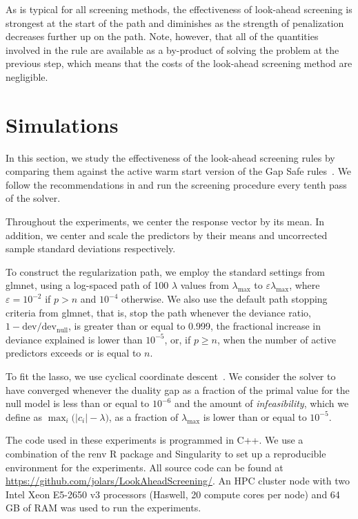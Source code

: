 \documentclass[b5paper,10pt,abstractoff,DIV=calc,headings=normal,twoside]{scrartcl}
\theoremstyle{plain}
\theoremstyle{definition}
\theoremstyle{remark}
\begin{document}
As is typical for all screening methods,
the effectiveness of look-ahead screening is strongest at the
start of the path and diminishes as the strength of
penalization decreases further up on the
path. Note, however, that all of the quantities involved in the rule are
available as a by-product of solving the problem at the previous step, which
means that the costs of the look-ahead screening method are negligible.

\section{Simulations}\label{seq:simulations}

In this section, we study the effectiveness of the look-ahead screening rules by
comparing them against the active warm start version of the Gap Safe
rules~\citep{fercoq2015,ndiaye2017}.  We follow the recommendations in
\citet{ndiaye2017} and run the screening procedure every tenth pass of the
solver.

Throughout the experiments, we center the response vector by its mean. In
addition, we center and scale the predictors by their means and uncorrected
sample standard deviations respectively.

To construct
the regularization path, we employ the standard settings from \textsf{glmnet},
using a log-spaced path of 100 \(\lambda\) values from \(\lambda_\text{max}\)
to \(\varepsilon \lambda_\text{max}\), where \(\varepsilon = 10^{-2}\) if
\(p > n\) and \(10^{-4}\) otherwise. We also use the default
path stopping criteria from \textsf{glmnet}, that is, stop the path whenever
the deviance ratio, \(1 - \text{dev}/\text{dev}_\text{null}\),
is greater than or equal to 0.999,
the fractional increase in deviance explained is lower than
\(10^{-5}\), or, if \(p \geq n\),
when the number of active predictors exceeds or is equal to
\(n\).

To fit the lasso, we
use cyclical coordinate descent~\cite{friedman2010}.
We consider the solver to have converged whenever
the duality gap as a fraction of the primal value
for the null model is less than or equal to \(10^{-6}\) and the amount of
\emph{infeasibility}, which we define as \(\max_i\big( |c_i| -
\lambda\big)\), as a fraction of \(\lambda_\text{max}\) is lower than or
equal to \(10^{-5}\).

The code used in these experiments is programmed in \textsf{C++}.
We use a combination of the \textsf{renv} R
package and Singularity to set up a
reproducible environment for the experiments. All
source code
can be found at \url{https://github.com/jolars/LookAheadScreening/}. An HPC
cluster node with two Intel Xeon E5-2650 v3 processors (Haswell, 20 compute
cores per node) and 64 GB of RAM was used to run the experiments.
\end{document}
